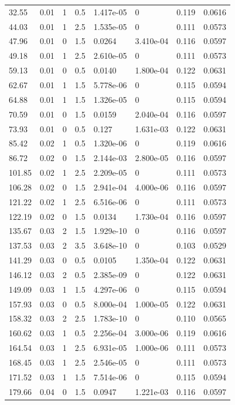 \documentclass[preview]{standalone}
\begin{document}
{{\begin{tabular}{L{1.2cm}C{1.2cm} C{0.3cm}C{0.5cm} C{1.4cm}C{1.4cm} C{1.4cm}C{1.4cm}}
  32.55  &  0.01  & 1     & 0.5 &  1.417e-05  & 0  & 0.119 &  0.0616   \\ 
  44.03  &  0.01  & 1     & 2.5 &  1.535e-05  & 0  & 0.111 &  0.0573   \\ 
  47.96  &  0.01  & 0     & 1.5 &  0.0264  & 3.410e-04  & 0.116 &  0.0597   \\ 
  49.18  &  0.01  & 1     & 2.5 &  2.610e-05  & 0  & 0.111 &  0.0573   \\ 
  59.13  &  0.01  & 0     & 0.5 &  0.0140  & 1.800e-04  & 0.122 &  0.0631   \\ 
  62.67  &  0.01  & 1     & 1.5 &  5.778e-06  & 0  & 0.115 &  0.0594   \\ 
  64.88  &  0.01  & 1     & 1.5 &  1.326e-05  & 0  & 0.115 &  0.0594   \\ 
  70.59  &  0.01  & 0     & 1.5 &  0.0159  & 2.040e-04  & 0.116 &  0.0597   \\ 
  73.93  &  0.01  & 0     & 0.5 &  0.127  & 1.631e-03  & 0.122 &  0.0631   \\ 
  85.42  &  0.02  & 1     & 0.5 &  1.320e-06  & 0  & 0.119 &  0.0616   \\ 
  86.72  &  0.02  & 0     & 1.5 &  2.144e-03  & 2.800e-05  & 0.116 &  0.0597   \\ 
  101.85  &  0.02  & 1     & 2.5 &  2.209e-05  & 0  & 0.111 &  0.0573   \\ 
  106.28  &  0.02  & 0     & 1.5 &  2.941e-04  & 4.000e-06  & 0.116 &  0.0597   \\ 
  121.22  &  0.02  & 1     & 2.5 &  6.516e-06  & 0  & 0.111 &  0.0573   \\ 
  122.19  &  0.02  & 0     & 1.5 &  0.0134  & 1.730e-04  & 0.116 &  0.0597   \\ 
  135.67  &  0.03  & 2     & 1.5 &  1.929e-10  & 0  & 0.116 &  0.0597   \\ 
  137.53  &  0.03  & 2     & 3.5 &  3.648e-10  & 0  & 0.103 &  0.0529   \\ 
  141.29  &  0.03  & 0     & 0.5 &  0.0105  & 1.350e-04  & 0.122 &  0.0631   \\ 
  146.12  &  0.03  & 2     & 0.5 &  2.385e-09  & 0  & 0.122 &  0.0631   \\ 
  149.09  &  0.03  & 1     & 1.5 &  4.297e-06  & 0  & 0.115 &  0.0594   \\ 
  157.93  &  0.03  & 0     & 0.5 &  8.000e-04  & 1.000e-05  & 0.122 &  0.0631   \\ 
  158.32  &  0.03  & 2     & 2.5 &  1.783e-10  & 0  & 0.110 &  0.0565   \\ 
  160.62  &  0.03  & 1     & 0.5 &  2.256e-04  & 3.000e-06  & 0.119 &  0.0616   \\ 
  164.54  &  0.03  & 1     & 2.5 &  6.931e-05  & 1.000e-06  & 0.111 &  0.0573   \\ 
  168.45  &  0.03  & 1     & 2.5 &  2.546e-05  & 0  & 0.111 &  0.0573   \\ 
  171.52  &  0.03  & 1     & 1.5 &  7.514e-06  & 0  & 0.115 &  0.0594   \\ 
  179.66  &  0.04  & 0     & 1.5 &  0.0947  & 1.221e-03  & 0.116 &  0.0597   \\ 
\hline 
\end{tabular} 

}}
\end{document}
